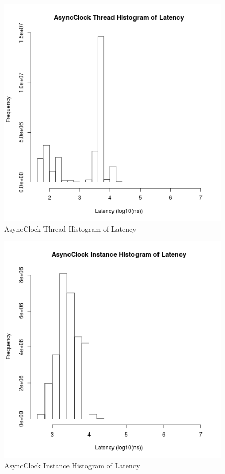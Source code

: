 \begin{figure}[H]
\center
\includegraphics[height=.4\textheight]{async_thread_latency_hist.png}
\caption{AsyncClock Thread Histogram of Latency}
\label{async_thread_latency}
\end{figure}

\begin{figure}[H]
\center
\includegraphics[height=.4\textheight]{async_instance_latency_hist.png}
\caption{AsyncClock Instance Histogram of Latency}
\label{async_instance_latency}
\end{figure}

